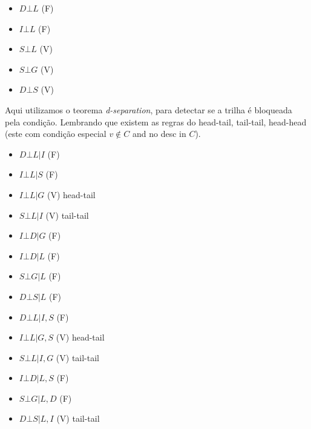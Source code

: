 \begin{itemize}
    \item $D \bot L$ (F)
    \item $I \bot L$ (F)
    \item $S \bot L$ (V)
    \item $S \bot G$ (V)
    \item $D \bot S$ (V)
\end{itemize}

Aqui utilizamos o teorema \textit{d-separation}, para detectar se a trilha é bloqueada pela condição.
Lembrando que existem as regras do head-tail, tail-tail, head-head (este com condição especial $v \notin C$ and no desc in $C$).

\begin{itemize}
    \item $D \bot L | I$ (F)
    \item $I \bot L | S$ (F)
    \item $I \bot L | G$ (V) head-tail
    \item $S \bot L | I$ (V) tail-tail
    \item $I \bot D | G$ (F)
    \item $I \bot D | L$ (F)
    \item $S \bot G | L$ (F)
    \item $D \bot S | L$ (F)
\end{itemize}

\begin{itemize}
    \item $D \bot L | I, S$ (F)
    \item $I \bot L | G, S$ (V) head-tail
    \item $S \bot L | I, G$ (V) tail-tail
    \item $I \bot D | L, S$ (F)
    \item $S \bot G | L, D$ (F)
    \item $D \bot S | L, I$ (V) tail-tail
\end{itemize}
